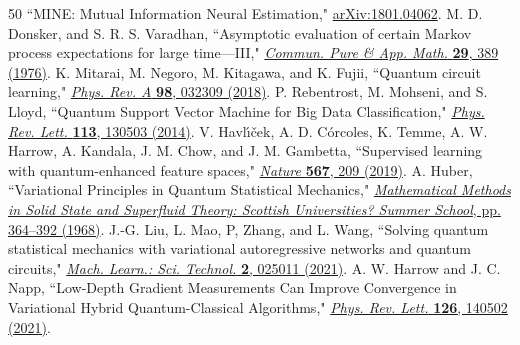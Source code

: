 \documentclass[aps,groupedaddress,superscriptaddress,amssymb,amsmath,amsbsy,amsfonts,twocolumn,pra]{revtex4}
\begin{document}
\begin{thebibliography}{50}
``MINE: Mutual Information Neural Estimation,"
\href{https://doi.org/10.48550/arXiv.1801.04062}{
arXiv:1801.04062}.
%
M. D. Donsker, and S. R. S. Varadhan,
``Asymptotic evaluation of certain Markov process expectations for large time---III,"
\href{http://dx.doi.org/10.1002/cpa.3160290405}{
{\it Commun. Pure \& App. Math.} \textbf{29}, 389 (1976)}.
%
K. Mitarai, M. Negoro, M. Kitagawa, and K. Fujii,
``Quantum circuit learning,"
\href{http://dx.doi.org/10.1103/PhysRevA.98.032309}{
{\it Phys. Rev. A} \textbf{98}, 032309 (2018)}. 
%
P. Rebentrost, M. Mohseni, and S. Lloyd,
``Quantum Support Vector Machine for Big Data Classification,"
\href{http://dx.doi.org/10.1103/PhysRevLett.113.130503}{
{\it Phys. Rev. Lett.} \textbf{113}, 130503 (2014)}.
%
V. Havl{\'\i}{\v{c}}ek, A. D. C{\'o}rcoles, K. Temme, A. W. Harrow, A. Kandala, J. M. Chow, and J. M. Gambetta,
``Supervised learning with quantum-enhanced feature spaces," 
\href{http://dx.doi.org/10.1038/s41586-019-0980-2}{
{\it Nature} \textbf{567}, 209 (2019)}.
%
A. Huber,
``Variational Principles in Quantum Statistical Mechanics,"
\href{https://link.springer.com/chapter/10.1007/978-1-4899-6435-9_14}{
{\it Mathematical Methods in Solid State and Superfluid Theory: Scottish Universities? Summer School}, pp. 364--392 (1968)}.
%
J.-G. Liu, L. Mao, P, Zhang, and L. Wang,
``Solving quantum statistical mechanics with variational autoregressive networks and quantum circuits," 
\href{http://dx.doi.org/10.1088/2632-2153/aba19d}{
{\it Mach. Learn.: Sci. Technol.} \textbf{2}, 025011 (2021)}.
%
A. W. Harrow and J. C. Napp,
``Low-Depth Gradient Measurements Can Improve Convergence in Variational Hybrid Quantum-Classical Algorithms,"
\href{http://dx.doi.org/10.1103/PhysRevLett.126.140502}{
{\it Phys. Rev. Lett.} \textbf{126}, 140502 (2021)}.



\end{thebibliography}
\end{document}

